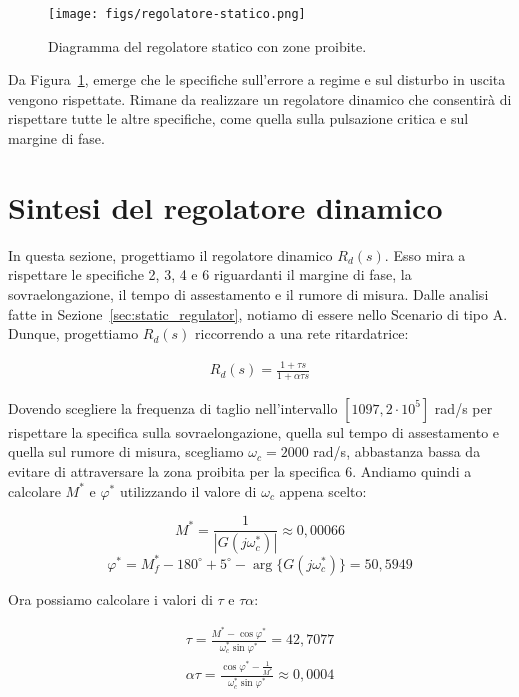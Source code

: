 \documentclass[a4paper, 11pt]{article}
\begin{document}
\begin{figure}[H]
    \centering
    \texttt{[image: figs/regolatore-statico.png]}
    \caption{Diagramma del regolatore statico con zone proibite.}
    \label{DiagrammaRegolatoreStatico}
\end{figure}

Da Figura~\ref{DiagrammaRegolatoreStatico}, emerge che le specifiche sull'errore a regime e sul disturbo in uscita vengono rispettate. Rimane da realizzare un regolatore dinamico che consentirà di rispettare tutte le altre specifiche, come quella sulla pulsazione critica e sul margine di fase.

\newpage
\section{Sintesi del regolatore dinamico}

In questa sezione, progettiamo il regolatore dinamico $R_d(s)$. Esso mira a rispettare le specifiche 2, 3, 4 e 6 riguardanti il margine di fase, la sovraelongazione, il tempo di assestamento e il rumore di misura.
Dalle analisi fatte in Sezione~\ref{sec:static_regulator}, notiamo di essere nello Scenario di tipo A. Dunque, progettiamo $R_d(s)$ riccorrendo a  una rete ritardatrice:

\begin{align}
    R_d(s) = \frac{1+\tau s}{1+\alpha\tau s}
\end{align}

Dovendo scegliere la frequenza di taglio nell'intervallo $[1097, 2 \cdot 10^5]$ rad/s per rispettare la specifica sulla sovraelongazione, quella sul tempo di assestamento e quella sul rumore di misura, scegliamo $\omega_c = 2000$ rad/s, abbastanza bassa da evitare di attraversare la zona proibita per la specifica 6. Andiamo quindi a calcolare $M^*$ e $\varphi^*$ utilizzando il valore di $\omega_c$ appena scelto:

\[M^* = \frac{1}{|G(j\omega_c^*)|} \approx 0,00066 \]
\[\varphi^* = M_f^* -180^\circ + 5^\circ - \arg\{G(j\omega_c^*)\} = 50,5949 \]

Ora possiamo calcolare i valori di $\tau$ e $\tau\alpha$:

\begin{subequations}
\begin{align}
    \tau = \frac {M^* - \cos \varphi^*} {\omega_c^* \sin \varphi^*} = 42,7077
    \\ \alpha\tau = \frac {\cos \varphi^* - \frac 1 {M^*}} {\omega_c^* \sin \varphi^*} \approx 0,0004
\end{align}
\end{subequations}
\end{document}
